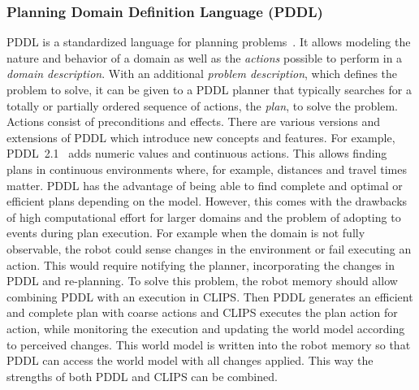 \documentclass[a4paper,11pt]{article}
\newcommand{\reflst}[1]{Listing~\ref{#1}}
\begin{document}
\subsubsection{Planning Domain Definition Language (PDDL)} PDDL is a
standardized language for planning problems~\cite{PDDL}. It allows
modeling the nature and behavior of a domain as well as the
\emph{actions} possible to perform in a \emph{domain
  description}. With an additional \emph{problem description}, which
defines the problem to solve, it can be given to a PDDL planner that
typically searches for a totally or partially ordered sequence of actions, the
\emph{plan}, to solve the problem.
Actions consist of preconditions and effects.  There are
various versions and extensions of PDDL which introduce new concepts
and features. For example, PDDL~2.1~\cite{PDDL2.1} adds numeric values and
continuous actions. This allows finding plans in continuous
environments where, for example, distances and travel times
matter. PDDL has the advantage of being able to find complete and
optimal or efficient plans depending on the model. However, this comes with the
drawbacks of high computational effort for larger domains and the
problem of adopting to events during plan execution. For example when
the domain is not fully observable, the robot could sense changes in
the environment or fail executing an action. This would require
notifying the planner, incorporating the changes in PDDL and
re-planning. To solve this problem, the robot memory should allow combining PDDL with an
execution in CLIPS. Then PDDL generates an efficient and complete plan
with coarse actions and CLIPS executes the plan action for action,
while monitoring the execution and updating the world model according
to perceived changes. This world model is written into the robot
memory so that PDDL can access the world model with all changes applied.
This way the strengths of both PDDL and CLIPS can be combined.


\end{document}
